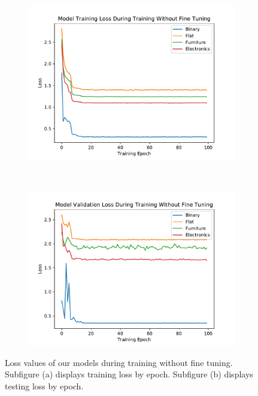 \begin{figure}
    \centering
    \begin{subfigure}[t]{0.5\columnwidth}
        \centering
        \includegraphics[width=\textwidth]{img/false_losses_train}
        \caption{}
    \end{subfigure}%
    ~ 
    \begin{subfigure}[t]{0.5\columnwidth}
        \centering
        \includegraphics[width=\textwidth]{img/false_losses_val}
        \caption{}
    \end{subfigure}%
	\caption{
Loss values of our models during training without fine tuning.
Subfigure (a) displays training loss by epoch.
Subfigure (b) displays testing loss by epoch. 
}
	\label{fig:false_losses}
\end{figure}